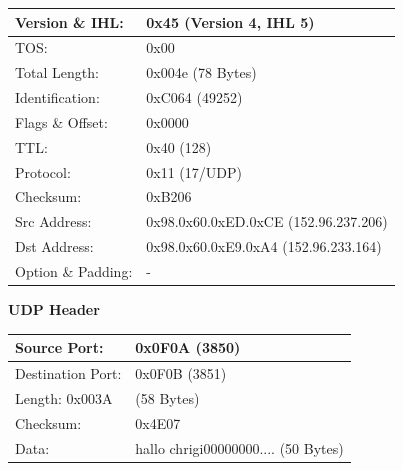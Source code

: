\begin{tabular}[h]{|l|l|}
	\hline
	Version \& IHL: & 0x45 (Version 4, IHL 5) \\
	\hline
	TOS: & 0x00 \\
	\hline
	Total Length: & 0x004e (78 Bytes) \\
	\hline
	Identification: & 0xC064 (49252) \\
	\hline
	Flags \& Offset: & 0x0000 \\
	\hline
	TTL: & 0x40 (128) \\
	\hline
	Protocol: & 0x11 (17/UDP) \\
	\hline
	Checksum: & 0xB206 \\
	\hline
	Src Address: & 0x98.0x60.0xED.0xCE (152.96.237.206) \\
	\hline
	Dst Address: & 0x98.0x60.0xE9.0xA4 (152.96.233.164) \\
	\hline
	Option \& Padding: & - \\
	\hline
\end{tabular}

\textbf{UDP Header}

\begin{tabular}[h]{|l|l|}
	\hline
	Source Port: & 0x0F0A (3850) \\
	\hline
	Destination Port: & 0x0F0B (3851) \\
	\hline
	Length: 0x003A & (58 Bytes) \\
	\hline
	Checksum: & 0x4E07 \\
	\hline
	Data: & hallo chrigi00000000.... (50 Bytes) \\
	\hline
\end{tabular}
